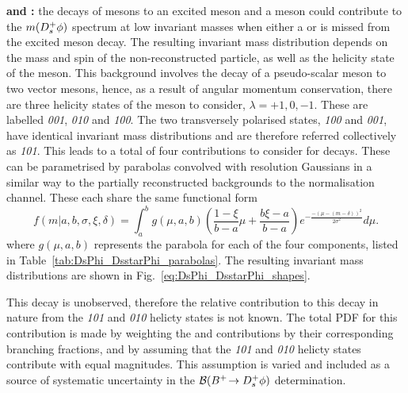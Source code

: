 \begin{description}
\item \textbf{\decay{\Bp}{(\decay{\Dssp}{\Dsp[\Pgamma]})\phiz} and \decay{\Bp}{(\decay{\Dssp}{\Dsp[\piz]})\phiz}:} the decays of \Bp mesons to an excited \Dsp meson and a \phiz meson could contribute to the $m({{D}^+_{s}}\phi)$ spectrum at low invariant masses when either a \piz or \Pgamma is missed from the excited meson decay. The resulting invariant mass distribution depends on the mass and spin of the non-reconstructed particle, as well as the helicity state of the \Dssp meson. This background involves the decay of a pseudo-scalar meson to two vector mesons, hence, as a result of angular momentum conservation, there are three helicity states of the \Dssp meson to consider, $\lambda = +1,0,-1$. These are labelled \emph{001}, \emph{010} and \emph{100}. The two transversely polarised states, \emph{100} and \emph{001}, have identical invariant mass distributions and are therefore referred collectively as \emph{101}. This leads to a total of four contributions to consider for \decay{\Bp}{\Dssp\phiz} decays. These can be parametrised by parabolas convolved with resolution Gaussians in a similar way to the partially reconstructed backgrounds to the normalisation channel.
These each share the same functional form
\begin{equation}
f(m|a,b,\sigma,\xi, \delta) = \int_{a}^{b} g(\mu,a,b) \left( \frac{1-\xi}{b-a}\mu + \frac{b\xi-a}{b-a} \right) e^{-\frac{-(\mu-(m-\delta))^{2}}{2\sigma^{2}}} d\mu.
\label{eq:DsPhi_DsstarPhi_shapes}
\end{equation}
where $g(\mu,a,b)$ represents the parabola for each of the four components, listed in Table~\ref{tab:DsPhi_DsstarPhi_parabolas}. The resulting invariant mass distributions are shown in Fig.~\ref{eq:DsPhi_DsstarPhi_shapes}.

This decay is unobserved, therefore the relative contribution to this decay in nature from the \emph{101} and \emph{010} helicty states is not known. The total PDF for this contribution is made by weighting the \piz and \Pgamma contributions by their corresponding branching fractions, and by assuming that the \emph{101} and \emph{010} helicty states contribute with equal magnitudes. This assumption is varied and included as a source of systematic uncertainty in the ${\mathcal{B}}({{{B}^+}}\!\rightarrow {\ensuremath{{D}^+_{s}}}\phi)$ determination.
\end{description}
 

